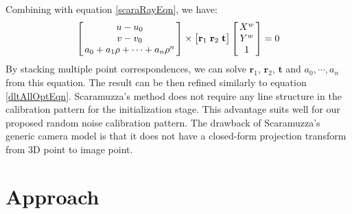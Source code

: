 \documentclass{report}
\begin{document}
Combining with equation \ref{scaraRayEqn}, we have: 
\begin{equation}
\arraycolsep=1.5pt%
\begin{bmatrix}
	\begin{array}{c}
	u - u_0 \\ v - v_0 \\ a_0 + a_1 \rho + \cdots + a_n \rho^n
	\end{array}
\end{bmatrix} 
\times
\begin{bmatrix}
\mathbf{r}_1 & \mathbf{r}_2 & \mathbf{t}
\end{bmatrix}
\arraycolsep=1.5pt%
\begin{bmatrix}
	\begin{array}{c}
	X^w \\ Y^w \\ 1
	\end{array}
\end{bmatrix}
= 0
\end{equation}
By stacking multiple point correspondences, we can solve $\mathbf{r}_1$, $\mathbf{r}_2$, $\mathbf{t}$ and $a_0, \cdots, a_n$ from this equation. The result can be then refined similarly to equation \ref{dltAllOptEqn}. Scaramuzza's method does not require any line structure in the calibration pattern for the initialization stage. This advantage suits well for our proposed random noise calibration pattern. The drawback of Scaramuzza's generic camera model is that it does not have a closed-form projection transform from 3D point to image point. 

\section{Approach}
\end{document}
